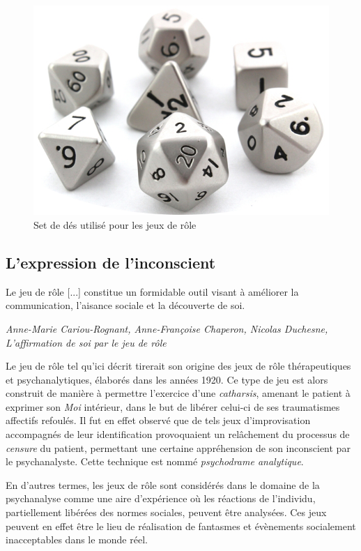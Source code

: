\begin{figure}[h!]
    \centering
    \includegraphics[width=0.80\linewidth]{img/dice_set.png}
    \caption{Set de dés utilisé pour les jeux de rôle}
\end{figure}

\clearpage


\subsection{L'expression de l'inconscient}

\begin{shadequote}
Le jeu de rôle [...] constitue un formidable outil visant à améliorer la communication, l'aisance sociale et la découverte de soi.
\par\emph{Anne-Marie Cariou-Rognant, Anne-Françoise Chaperon, Nicolas Duchesne, L'affirmation de soi par le jeu de rôle}
\end{shadequote}

Le jeu de rôle tel qu'ici décrit tirerait son origine des jeux de rôle thérapeutiques et psychanalytiques, élaborés dans les années 1920. Ce type de jeu est alors construit de manière à permettre l'exercice d'une \textit{catharsis}, amenant le patient à exprimer son \textit{Moi} intérieur, dans le but de libérer celui-ci de ses traumatismes affectifs refoulés. Il fut en effet observé que de tels jeux d'improvisation accompagnés de leur identification provoquaient un relâchement du processus de \textit{censure} du patient, permettant une certaine appréhension de son inconscient par le psychanalyste. Cette technique est nommé \textit{psychodrame analytique}.

En d'autres termes, les jeux de rôle sont considérés dans le domaine de la psychanalyse comme une aire d'expérience où les réactions de l'individu, partiellement libérées des normes sociales, peuvent être analysées. Ces jeux peuvent en effet être le lieu de réalisation de fantasmes et évènements socialement inacceptables dans le monde réel.\\


